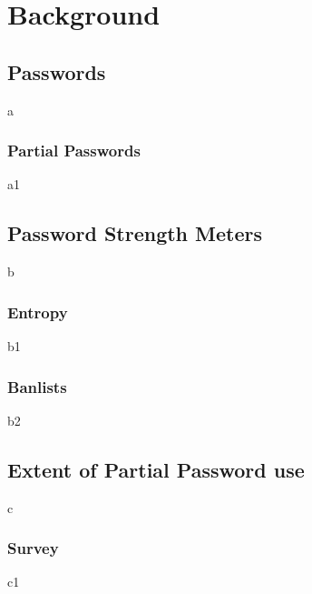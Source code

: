 
\chapter{Background}
\label{cha:background}

  \section{Passwords}
    a

    \subsection{Partial Passwords}
      a1

  \section{Password Strength Meters}
    b

    \subsection{Entropy}
      b1

    \subsection{Banlists}
      b2

  \section{Extent of Partial Password use}
    c

    \subsection{Survey}
      c1